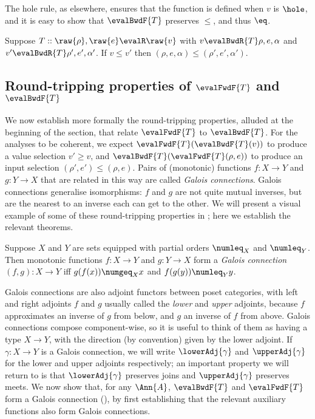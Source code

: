  The hole rule, as elsewhere, ensures that the function is defined when $v$ is $\hole$, and it is easy to show that $\evalBwdF{T}$  preserves $\leq$, and thus $\eq$.

\begin{lemma}
   Suppose $T :: \raw{\rho}, \raw{e} \evalR \raw{v}$ with $v \evalBwdR{T} \rho, e, \alpha $ and $v' \evalBwdR{T} \rho', e', \alpha' $. If $v \leq v'$ then $(\rho, e, \alpha) \leq (\rho', e', \alpha')$.
\end{lemma}

\newpage
\subsection{Round-tripping properties of $\evalFwdF{T}$ and $\evalBwdF{T}$}
\label{sec:data-dependencies:galois-connections}

We now establish more formally the round-tripping properties, alluded at the beginning of the section, that relate $\evalFwdF{T}$ to $\evalBwdF{T}$. For the analyses to be coherent, we expect $\evalFwdF{T}(\evalBwdF{T}(v))$ to produce a value selection $v' \geq v$, and $\evalBwdF{T}(\evalFwdF{T}(\rho,e))$ to produce an input selection $(\rho',e') \leq (\rho,e)$. Pairs of (monotonic) functions $f: X \to Y$ and $g: Y \to X$ that are related in this way are called \emph{Galois connections}. Galois connections generalise isomorphisms: $f$ and $g$ are not quite mutual inverses, but are the nearest to an inverse each can get to the other. We will present a visual example of some of these round-tripping properties in ; here we establish the relevant theorems.

\begin{definition}
   Suppose $X$ and $Y$ are sets equipped with partial orders $\numleq_X$ and $\numleq_Y$. Then monotonic functions $f: X \to Y$ and $g: Y \to X$ form a \emph{Galois connection} $(f, g): X \to Y$ iff $g(f(x)) \numgeq_X x$ and $f(g(y)) \numleq_Y y$.
\end{definition}

\noindent Galois connections are also adjoint functors between poset categories, with left and right adjoints $f$ and $g$  usually called the \emph{lower} and \emph{upper} adjoints, because $f$ approximates an inverse of $g$ from below, and $g$ an inverse of $f$ from above. Galois connections compose component-wise, so it is useful to think of them as having a type $X \to Y$, with the direction (by convention) given by the lower adjoint. If $\gamma: X \to Y$ is a Galois connection, we will write $\lowerAdj{\gamma}$ and $\upperAdj{\gamma}$ for the lower and upper adjoints respectively; an important property we will return to is that $\lowerAdj{\gamma}$ preserves joins and $\upperAdj{\gamma}$ preserves meets. We now show that, for any $\Ann{A}$, $\evalBwdF{T}$ and $\evalFwdF{T}$ form a Galois connection (), by first establishing that the relevant auxiliary functions also form Galois connections.

